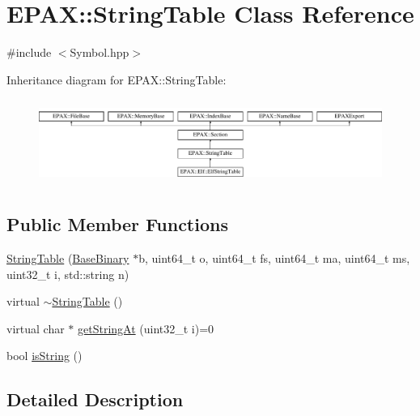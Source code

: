 \hypertarget{class_e_p_a_x_1_1_string_table}{\section{\-E\-P\-A\-X\-:\-:\-String\-Table \-Class \-Reference}
\label{class_e_p_a_x_1_1_string_table}
}


{\ttfamily \#include $<$\-Symbol.\-hpp$>$}

\-Inheritance diagram for \-E\-P\-A\-X\-:\-:\-String\-Table\-:\begin{figure}[H]
\begin{center}
\leavevmode
\includegraphics[height=2.800000cm]{class_e_p_a_x_1_1_string_table}
\end{center}
\end{figure}
\subsection*{\-Public \-Member \-Functions}
\begin{DoxyCompactItemize}
\item 
\hyperlink{class_e_p_a_x_1_1_string_table_a487cb8b4ce67da9743b6d8a2190aa7c8}{\-String\-Table} (\hyperlink{class_e_p_a_x_1_1_base_binary}{\-Base\-Binary} $\ast$b, uint64\-\_\-t o, uint64\-\_\-t fs, uint64\-\_\-t ma, uint64\-\_\-t ms, uint32\-\_\-t i, std\-::string n)
\item 
virtual \hyperlink{class_e_p_a_x_1_1_string_table_a7ac3b4fafdce508fed174efd5563b8b2}{$\sim$\-String\-Table} ()
\item 
virtual char $\ast$ \hyperlink{class_e_p_a_x_1_1_string_table_a1931cd14e2e3e1be340386f8bbbc6d2a}{get\-String\-At} (uint32\-\_\-t i)=0
\item 
bool \hyperlink{class_e_p_a_x_1_1_string_table_aef50a7eae11bd12b0c4ed93fff694c1d}{is\-String} ()
\end{DoxyCompactItemize}


\subsection{\-Detailed \-Description}


